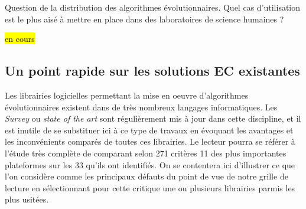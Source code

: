 Question de la distribution des algorithmes évolutionnaires. Quel cas d'utilisation est le plus aisé à mettre en place dans des laboratoires de science humaines ?

\hl{en cours}















\subsection{Un point rapide sur les solutions EC existantes}
\label{ssec:EC_existantes}

Les librairies logicielles permettant la mise en oeuvre d'algorithmes évolutionnaires existent dans de très nombreux langages informatiques. Les \textit{Survey} ou \textit{state of the art} sont régulièrement mis à jour dans cette discipline, et il est inutile de se substituer ici à ce type de travaux en évoquant les avantages et les inconvénients comparés de toutes ces librairies. Le lecteur pourra se référer à l'étude très complète de \textcite{Parejo2012} comparant selon 271 critères 11 des plus importantes plateformes sur les 33 qu'ils ont identifiés. On se contentera ici d'illustrer ce que l'on considère comme les principaux défauts du point de vue de notre grille de lecture en sélectionnant pour cette critique une ou plusieurs librairies parmis les plus usitées.

